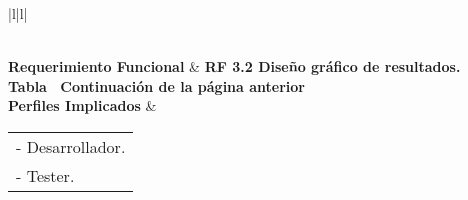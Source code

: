 \begin{longtable}{|l|l|}
\caption{Prueba unitaria RF3.2}
\label{PU_RF3_2}\\
\hline
\textbf{Requerimiento Funcional}                                                        & \textbf{RF 3.2  Diseño gráfico de resultados.}                                                                                                                                                                                                                                                                                                                                                                                                                                                                                                                                                                                                                                                                      \\ \hline
\endfirsthead
%
%
{{\bfseries Tabla \thetable\ Continuación de la página anterior}} \\
\endhead
%
\textbf{Perfiles Implicados}                                                            & \begin{tabular}[c]{@{}l@{}}- Desarrollador.\\ - Tester.\end{tabular}                                                                                                                                                                                                                                                                                                                                                                                                                                                                                                                                                                                                                                                \\ \hline

\end{longtable}
